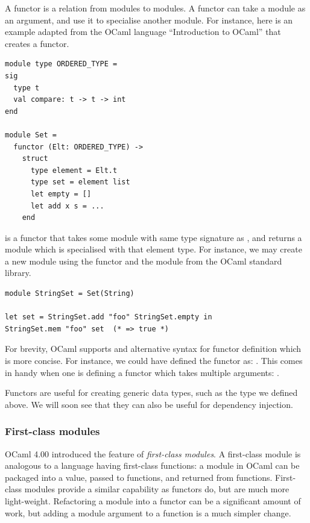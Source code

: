 A functor is a relation from modules to modules. A functor can take a
module as an argument, and use it to specialise another module. For
instance, here is an example adapted from the OCaml language
``Introduction to OCaml'' \cite{ocaml:spec} that creates a 
functor.

\begin{lstlisting}
module type ORDERED_TYPE =
sig
  type t
  val compare: t -> t -> int
end

module Set =
  functor (Elt: ORDERED_TYPE) ->
    struct
      type element = Elt.t
      type set = element list
      let empty = []
      let add x s = ...
    end
\end{lstlisting}

 is a functor that takes some module with same type
signature as , and returns a module which is
specialised with that element type. For instance, we may create a new
 module using the  functor and the
 module from the OCaml standard library.

\begin{lstlisting}
module StringSet = Set(String)

let set = StringSet.add "foo" StringSet.empty in
StringSet.mem "foo" set  (* => true *)
\end{lstlisting}

For brevity, OCaml supports and alternative syntax for functor
definition which is more concise. For instance, we could have defined
the  functor as:
.
This comes in handy when one is defining a functor which takes
multiple arguments:
 .

Functors are useful for creating generic data types, such as the
 type we defined above. We will soon see that they can also
be useful for dependency injection.

\subsubsection{First-class modules}

OCaml 4.00 introduced the feature of \textit{first-class modules}. A
first-class module is analogous to a language having first-class
functions: a module in OCaml can be packaged into a value, passed to
functions, and returned from functions. First-class modules provide a
similar capability as functors do, but are much more
light-weight. Refactoring a module into a functor can be a significant
amount of work, but adding a module argument to a function is a much
simpler change.

